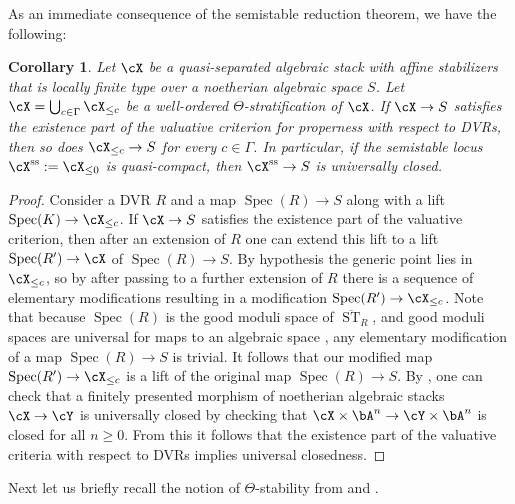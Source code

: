 \documentclass[a4paper]{amsart}
\numberwithin{equation}{section}
\theoremstyle{plain}
\newtheorem{cor}[thm]{Corollary}
\theoremstyle{definition}
\DeclareMathOperator{\Spec}{Spec}
\DeclareMathOperator{\ST}{ST}
\renewcommand{\ss}{{\rm ss}}
\def\oST{\overline{\ST}}
\begin{document}
As an immediate consequence of the semistable reduction theorem, we have the following:
\begin{cor} \label{C:valuative_criterion_semistable}
Let $\cX$ be a quasi-separated algebraic stack with affine {stabilizers} that is locally finite type over a noetherian algebraic space $S$. Let $\cX = \bigcup_{c \in \Gamma} \cX_{\leq c}$ be a well-ordered $\Theta$-stratification of $\cX$. If $\cX \to S$ satisfies the existence part of the valuative criterion for properness with respect to DVRs, then so does $\cX_{\leq c} \to S$ for every $c \in \Gamma$.  In particular, if the semistable locus $\cX^{\ss}:=\cX_{\le 0}$ is quasi-compact, then $\cX^{\ss} \to S$ is universally closed.
\end{cor}
\begin{proof} 
Consider a DVR $R$ and a map $\Spec(R) \to S$ along with a lift $\Spec(K) \to \cX_{\le c}$. If $\cX \to S$ satisfies the existence part of the valuative criterion, then after an extension of $R$ one can extend this lift to a lift $\Spec(R') \to \cX$ of $\Spec(R) \to S$. By hypothesis the generic point lies in $\cX_{\le c}$, so by  after passing to a further extension of $R$ there is a sequence of elementary modifications resulting in a modification $\Spec(R') \to \cX_{\le c}$. Note that because $\Spec(R)$ is the good moduli space of $\oST_R$, and good moduli spaces are universal for maps to an algebraic space \cite[Thm.~6.6]{alper-good}, any elementary modification of a map $\Spec(R) \to S$ is trivial. It follows that our modified map $\Spec(R') \to \cX_{\le c}$ is a lift of the original map $\Spec(R) \to S$. By \cite[Lem.~2.4.6]{hlp}, one can check that a finitely presented morphism of noetherian algebraic stacks $\cX \to \cY$ is universally closed by checking that $\cX \times \bA^n \to \cY \times \bA^n$ is closed for all $n\geq 0$. From this it follows that the existence part of the valuative criteria with respect to DVRs implies universal closedness.
\end{proof}

Next let us briefly recall the notion of $\Theta$-stability from \cite[Def.~4.1.1 \& 4.1.3]{hlinstability} and \cite[Def.~1.2]{heinloth-stability}.
\end{document}
